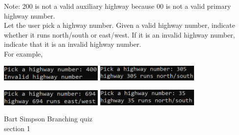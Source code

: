 \documentclass{article}
\begin{document}
\begin{enumerate}
		Note: 200 is not a valid auxiliary highway because 00 is not a valid primary highway 
		number.\\
		
		Let the user pick a highway number.  Given a valid highway number, indicate whether it runs 
		north/south or east/west.  If it is an invalid highway number, indicate that it is an 
		invalid highway number. \\
		For example,
		
		\hfill
		\includegraphics[width = 2in]{./imgs/highwayValidator1.PNG} \hfill
		\includegraphics[width = 2in]{./imgs/highwayValidator2.PNG} \hfill \ 

		\hfill 
		\includegraphics[width = 2in]{./imgs/highwayValidator3.PNG} \hfill 
		\includegraphics[width = 2in]{./imgs/highwayValidator4.PNG} \hfill \ 


\end{enumerate}
\pagebreak
Bart Simpson \hfill Branching quiz\\
section 1\\
\end{document}
